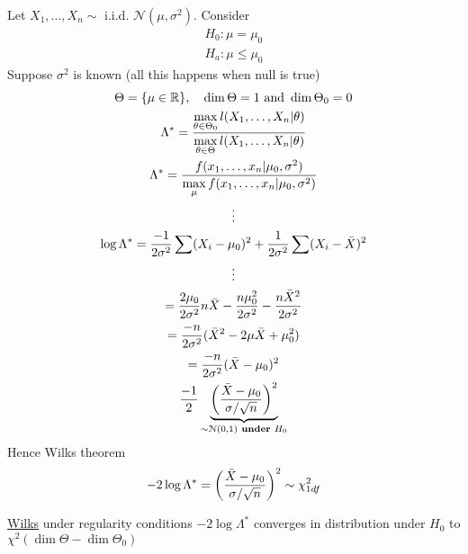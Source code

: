 \begin{example-N}
	Let $X_1, \ldots, X_n \sim$ i.i.d. $\mathcal{N}(\mu, \sigma^2)$. Consider
	\begin{gather*}
		H_0: \mu = \mu_0\\
		H_a: \mu \leq \mu_0
	\end{gather*}
	Suppose $\sigma^2$ is known (all this happens when null is true)
	\begin{gather*}
		\Theta = \{ \mu \in \mathbb{R} \}, \quad \dim \Theta = 1 \text{ and } \dim \Theta_0 = 0\\
		\Lambda^* = \frac{\max\limits_{\theta \in \Theta_0} l(X_1, \ldots, X_n | \theta) }{\max\limits_{\theta \in \Theta} l(X_1, \ldots, X_n | \theta) }\\
		\Lambda^* = \frac{f(x_1, \ldots, x_n | \mu_0, \sigma^2)}{\max\limits_{\mu} f(x_1, \ldots, x_n | \mu_0, \sigma^2)}\\
		\vdots\\
		\log \Lambda^* = \frac{-1}{2\sigma^2} \sum (X_i - \mu_0)^2 + \frac{1}{2\sigma^2} \sum (X_i - \bar{X})^2\\
		\vdots\\
		= \frac{2\mu_0}{2\sigma^2} n \bar{X} - \frac{n\mu_0^2}{2\sigma^2} - \frac{n\bar{X}^2}{2\sigma^2}\\ = \frac{-n}{2\sigma^2} (\bar{X}^2 - 2\mu \bar{X} + \mu_0^2)\\
		= \frac{-n}{2\sigma^2} (\bar{X} - \mu_0)^2\\
		\frac{-1}{2} \underbrace{\bigg(\frac{\bar{X} - \mu_0}{\sigma / \sqrt{n}} \bigg)^2}_{\sim \mathcal{N}(0, 1) \textbf{ under $H_0$}}
	\end{gather*}
	Hence Wilks theorem 
	\begin{gather*}
		-2 \log \Lambda^* = \bigg(\frac{\bar{X} - \mu_0}{\sigma / \sqrt{n}} \bigg)^2 \sim \chi^2_{1 df}
	\end{gather*}
\end{example-N}
\underline{Wilks} under regularity conditions $-2 \log \Lambda^*$ converges in distribution under $H_0$ to $\chi^2(\dim \Theta - \dim \Theta_0)$